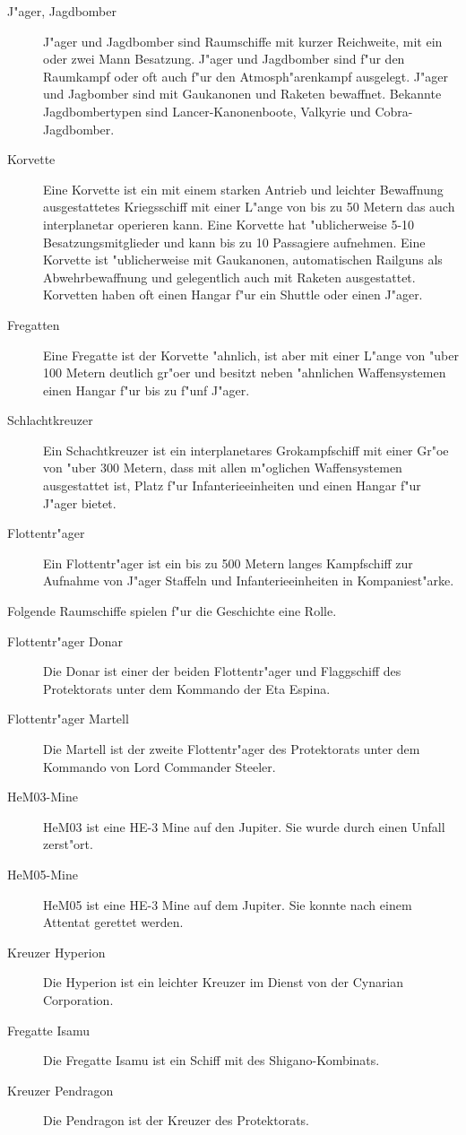 \begin{description}
\item [J"ager, Jagdbomber] J"ager und Jagdbomber sind Raumschiffe mit kurzer Reichweite, mit ein oder zwei Mann Besatzung.
      J"ager und Jagdbomber sind f"ur den Raumkampf oder oft auch f"ur den Atmosph"arenkampf ausgelegt. J"ager und Jagbomber sind mit Gau\3kanonen und Raketen bewaffnet. Bekannte Jagdbombertypen sind Lancer-Kanonenboote, Valkyrie und Cobra-Jagdbomber.
\item [Korvette] Eine Korvette ist ein mit einem starken Antrieb und leichter Bewaffnung ausgestattetes Kriegsschiff
      mit einer L"ange von bis zu 50 Metern das auch interplanetar operieren kann. Eine Korvette hat "ublicherweise 5-10 Besatzungsmitglieder und kann bis zu 10 Passagiere aufnehmen. Eine Korvette ist "ublicherweise mit Gau\3kanonen, automatischen Railguns als Abwehrbewaffnung und gelegentlich auch mit Raketen ausgestattet. Korvetten haben oft einen Hangar f"ur ein Shuttle oder einen J"ager.
\item [Fregatten] Eine Fregatte ist der Korvette "ahnlich, ist aber mit einer L"ange von "uber 100 Metern deutlich gr"o\3er und besitzt
      neben "ahnlichen Waffensystemen einen Hangar f"ur bis zu f"unf J"ager.
\item [Schlachtkreuzer] Ein Schachtkreuzer ist ein interplanetares Gro\3kampfschiff mit einer Gr"o\3e von "uber 300 Metern,
      dass mit allen m"oglichen Waffensystemen ausgestattet ist, Platz f"ur Infanterieeinheiten und einen Hangar f"ur J"ager bietet.
\item [Flottentr"ager] Ein Flottentr"ager ist ein bis zu 500 Metern langes Kampfschiff zur Aufnahme von J"ager Staffeln und 
      Infanterieeinheiten in Kompaniest"arke.
\end{description}

Folgende Raumschiffe spielen f"ur die Geschichte eine Rolle.

\begin{description}
\item [Flottentr"ager Donar] Die Donar ist einer der beiden Flottentr"ager und Flaggschiff des Protektorats unter
       dem Kommando der Eta Espina.
\item [Flottentr"ager Martell] Die Martell ist der zweite Flottentr"ager des Protektorats unter dem Kommando von Lord Commander Steeler.
\item [HeM03-Mine] HeM03 ist eine HE-3 Mine auf den Jupiter. Sie wurde durch einen Unfall zerst"ort.
\item [HeM05-Mine] HeM05 ist eine HE-3 Mine auf dem Jupiter. Sie konnte nach einem Attentat gerettet werden.
\item [Kreuzer Hyperion] Die Hyperion ist ein leichter Kreuzer im Dienst von der Cynarian Corporation.
\item [Fregatte Isamu] Die Fregatte Isamu ist ein Schiff mit des Shigano-Kombinats.
\item [Kreuzer Pendragon] Die Pendragon ist der Kreuzer des Protektorats.
\end{description}

